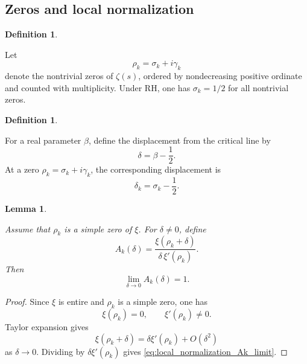 \documentclass[11pt]{amsart}
\numberwithin{equation}{section}
\theoremstyle{plain}
\newtheorem{lemma}[theorem]{Lemma}
\theoremstyle{definition}
\newtheorem{definition}[theorem]{Definition}
\theoremstyle{remark}
\begin{document}
\subsection{Zeros and local normalization}
\label{subsec:zeros_local_normalization}

\begin{definition}
\label{def:general_nontrivial_zero}

Let
\begin{equation}
\rho_k
=
\sigma_k+i\gamma_k
\label{eq:general_nontrivial_zero}
\end{equation}
denote the nontrivial zeros of \(\zeta(s)\), ordered by nondecreasing positive ordinate and counted with multiplicity.  Under RH, one has \(\sigma_k=1/2\) for all nontrivial zeros.

\end{definition}

\begin{definition}
\label{def:real_displacement_from_critical_line}

For a real parameter \(\beta\), define the displacement from the critical line by
\begin{equation}
\delta
=
\beta-\frac{1}{2}.
\label{eq:real_displacement_from_critical_line}
\end{equation}
At a zero \(\rho_k=\sigma_k+i\gamma_k\), the corresponding displacement is
\begin{equation}
\delta_k
=
\sigma_k-\frac{1}{2}.
\label{eq:zero_real_displacement_from_critical_line}
\end{equation}

\end{definition}

\begin{lemma}
\label{lem:local_normalization_at_simple_zero}

Assume that \(\rho_k\) is a simple zero of \(\xi\).  For \(\delta\neq0\), define
\begin{equation}
A_k(\delta)
=
\frac{\xi(\rho_k+\delta)}{\delta\,\xi'(\rho_k)}.
\label{eq:local_normalization_Ak}
\end{equation}
Then
\begin{equation}
\lim_{\delta\to0}A_k(\delta)=1.
\label{eq:local_normalization_Ak_limit}
\end{equation}

\end{lemma}

\begin{proof}
Since \(\xi\) is entire and \(\rho_k\) is a simple zero, one has
\begin{equation}
\xi(\rho_k)=0,
\qquad
\xi'(\rho_k)\neq0.
\label{eq:simple_zero_conditions_xi}
\end{equation}
Taylor expansion gives
\begin{equation}
\xi(\rho_k+\delta)
=
\delta\xi'(\rho_k)+O(\delta^2)
\label{eq:xi_taylor_at_simple_zero}
\end{equation}
as \(\delta\to0\).  Dividing by \(\delta\xi'(\rho_k)\) gives \eqref{eq:local_normalization_Ak_limit}.
\end{proof}
\end{document}
